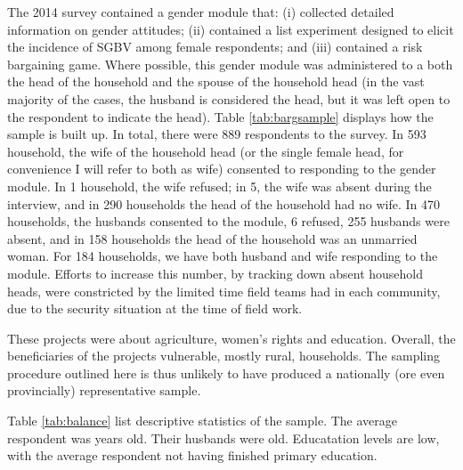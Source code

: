 \documentclass[10pt,a4paper]{scrartcl} %
\begin{document}
The 2014 survey contained a gender module that: (i) collected detailed information on gender attitudes; (ii) contained a list experiment designed to elicit the incidence of SGBV among female respondents; and (iii) contained a risk bargaining game. Where possible, this gender module was administered to a both the head of the household and the spouse of the household head (in the vast majority of the cases, the husband is considered the head, but it was left open to the respondent to indicate the head). Table \ref{tab:bargsample} displays how the sample is built up. In total, there were 889 respondents to the survey. In 593 household, the wife of the household head (or the single female head, for convenience I will refer to both as wife) consented to responding to the gender module. In 1 household, the wife refused; in 5, the wife was absent during the interview, and in 290 households the head of the household had no wife. In 470 households, the husbands consented to the module, 6 refused, 255 husbands were absent, and in 158 households the head of the household was an unmarried woman. For 184 households, we have both husband and wife responding to the module. Efforts to increase this number, by tracking down absent household heads, were constricted by the limited time field teams had in each community, due to the security situation at the time of field work.

These projects were about agriculture, women's rights and education. Overall, the beneficiaries of the projects vulnerable, mostly rural, households. The sampling procedure outlined here is thus unlikely to have produced a nationally (ore even provincially) representative sample. 

Table \ref{tab:balance} list descriptive statistics of the sample. The average respondent was  years old. Their husbands were  old. Educatation levels are low, with the average respondent not having finished primary education.
\end{document}
